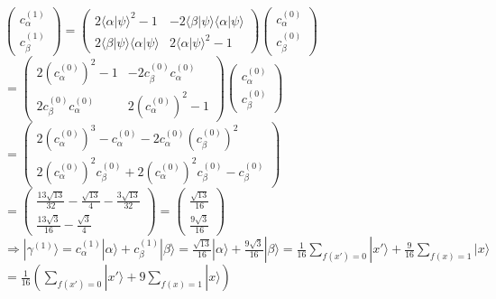 \documentclass[a4paper]{scrartcl}
\begin{document}
\begin{enumerate}[a)]
$\begin{pmatrix} c_{\alpha}^{(1)}\\ c_{\beta}^{(1)}\end{pmatrix} = \begin{pmatrix} 2 \langle \alpha | \psi \rangle^2 -1 & -2 \langle \beta | \psi \rangle \langle \alpha | \psi \rangle \\ 2 \langle \beta | \psi \rangle \langle \alpha | \psi \rangle & 2 \langle \alpha | \psi \rangle^2 -1 \end{pmatrix} \begin{pmatrix} c_{\alpha}^{(0)}\\ c_{\beta}^{(0)}\end{pmatrix}$\\
$=\begin{pmatrix} 2 (c_{\alpha}^{(0)})^2 -1 & -2 c_{\beta}^{(0)} c_{\alpha}^{(0)} \\ 2 c_{\beta}^{(0)} c_{\alpha}^{(0)} & 2 (c_{\alpha}^{(0)})^2 -1 \end{pmatrix} \begin{pmatrix} c_{\alpha}^{(0)}\\ c_{\beta}^{(0)}\end{pmatrix}$\\
$= \begin{pmatrix} 2 (c_{\alpha}^{(0)})^3 -c_{\alpha}^{(0)} - 2c_{\alpha}^{(0)} (c_{\beta}^{(0)})^2 \\ 2(c_{\alpha}^{(0)})^2c_{\beta}^{(0)} + 2(c_{\alpha}^{(0)})^2c_{\beta}^{(0)} -c_{\beta}^{(0)}\end{pmatrix}$\\

$= \begin{pmatrix} \frac{13\sqrt{13}}{32} - \frac{\sqrt{13}}{4} - \frac{3\sqrt{13}}{32} \\ \frac{13\sqrt{3}}{16} - \frac{\sqrt{3}}{4}\end{pmatrix} = \begin{pmatrix}\frac{\sqrt{13}}{16} \\ \frac{9\sqrt{3}}{16}\end{pmatrix}$\\

$\Rightarrow |\gamma^{(1)}\rangle = c_{\alpha}^{(1)} |\alpha\rangle + c_{\beta}^{(1)} |\beta\rangle = \frac{\sqrt{13}}{16} |\alpha\rangle + \frac{9\sqrt{3}}{16} |\beta\rangle
= \frac{1}{16} \sum_{f(x')=0} |x'\rangle+ \frac{9}{16} \sum_{f(x)=1} |x\rangle$\\
$= \frac{1}{16} (\sum_{f(x')=0} |x'\rangle+ 9 \sum_{f(x)=1} |x\rangle)$\\


\end{enumerate}
\end{document}
